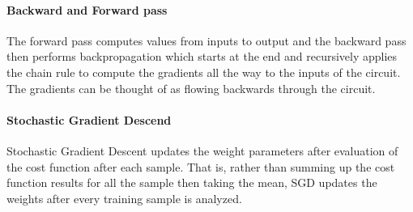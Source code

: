 \paragraph{Backward and Forward pass}
The forward pass computes values from inputs to output and the backward pass then performs backpropagation which starts at the end and recursively applies the chain rule to compute the gradients all the way to the inputs of the circuit. The gradients can be thought of as flowing backwards through the circuit.


\paragraph{Stochastic Gradient Descend}
Stochastic Gradient Descent updates the weight parameters after evaluation of the cost function after each sample.  That is, rather than summing up the cost function results for all the sample then taking the mean, SGD updates the weights after every training sample is analyzed.

